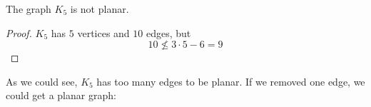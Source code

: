 \begin{thmbox}
    \begin{corollary}
        The graph $ K_5 $ is not planar.
    \end{corollary}
\end{thmbox}
\begin{proof}
    $ K_5 $ has $ 5 $ vertices and $ 10 $ edges, but
    \[ 10\nleqslant 3\cdot 5-6=9 \]
\end{proof}
As we could see, $ K_5 $ has too many edges to be planar.
If we removed one edge, we could get a planar graph:

\begin{figure}[H]
    \centering
    \begin{tikzpicture}[x=0.75pt,y=0.75pt,yscale=-1,xscale=1]


\end{tikzpicture}
\end{figure}
